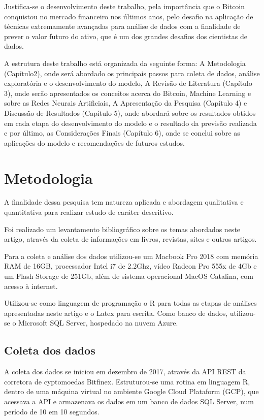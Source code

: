 \documentclass[12pt]{article}
\begin{document}
Justifica-se o desenvolvimento deste trabalho, pela importância que o Bitcoin
conquistou no mercado financeiro nos últimos anos, pelo desafio na aplicação de
técnicas extremamente avançadas para análise de dados com a finalidade de prever 
o valor futuro do ativo, que é um dos grandes desafios dos cientistas de dados.

A estrutura deste trabalho está organizada da seguinte forma: 
A Metodologia (Capítulo2), onde será abordado os principais passos para 
coleta de dados, análise exploratória e o desenvolvimento do modelo, A Revisão 
de Literatura (Capítulo 3), onde serão apresentados os conceitos acerca do 
Bitcoin, Machine Learning e sobre as Redes Neurais Artificiais, A Apresentação 
da Pesquisa (Capítulo 4) e Discussão de Resultados (Capítulo 5), onde abordará 
sobre os resultados obtidos em cada etapa do desenvolvimento do modelo e o 
resultado da previsão realizada e por último, as Considerações Finais 
(Capítulo 6), onde se conclui sobre as aplicações do modelo e recomendações de 
futuros estudos.


\section{Metodologia} \label{sec:firstpage}

A finalidade dessa pesquisa tem natureza aplicada e abordagem qualitativa e 
quantitativa para realizar estudo de caráter descritivo.

Foi realizado um levantamento bibliográfico sobre os temas abordados neste 
artigo, através da coleta de informações em livros, revistas, sites e outros 
artigos.

Para a coleta e análise dos dados utilizou-se um Macbook Pro 2018 com memória 
RAM de 16GB, processador Intel i7 de 2.2Ghz, vídeo Radeon Pro 555x de 4Gb e um
Flash Storage de 251Gb, além de sistema operacional MacOS Catalina, com acesso
à internet.

Utilizou-se como linguagem de programação o R \cite{r:2020} para todas as etapas 
de análises apresentadas neste artigo e o Latex \cite{goossens93} para escrita. 
Como banco de dados, utilizou-se o Microsoft SQL Server, hospedado na nuvem 
Azure.

\subsection{Coleta dos dados}

A coleta dos dados se iniciou em dezembro de 2017, através da API REST da 
corretora de cyptomoedas Bitfinex. Estruturou-se uma rotina em linguagem R, 
dentro de uma máquina virtual no ambiente Google Cloud Plataform (GCP), 
que acessava a API e armazenava os dados em um banco de dados SQL Server, 
num período de 10 em 10 segundos.
\end{document}

